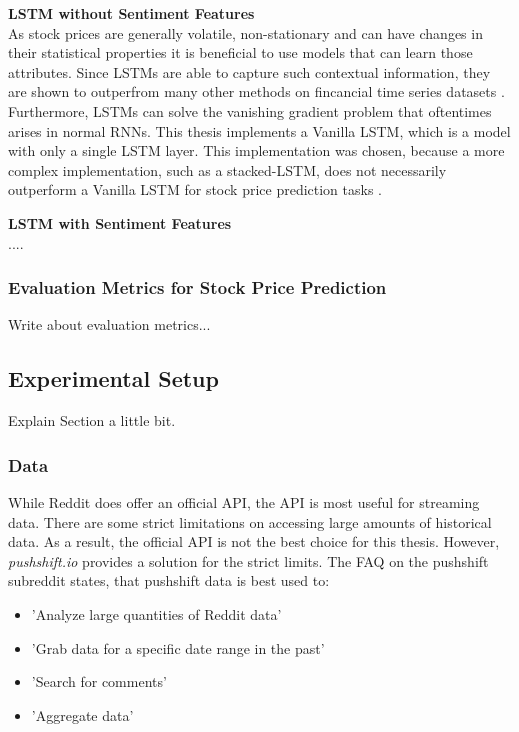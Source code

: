 \documentclass[11pt, a4paper]{article}
\begin{document}
\noindent\textbf{LSTM without Sentiment Features}\\
As stock prices are generally volatile, non-stationary and can have changes in their statistical properties it is beneficial to use
models that can learn those attributes. Since LSTMs are able to capture such contextual information, they are shown to outperfrom many other methods
on fincancial time series datasets \citep{preeti2019lstm}. Furthermore, LSTMs can solve the vanishing gradient problem that oftentimes arises in
normal RNNs. This thesis implements a Vanilla LSTM, which is a model with only a single LSTM layer. This implementation was chosen, because a more complex
implementation, such as a stacked-LSTM, does not necessarily outperform a Vanilla LSTM for stock price prediction tasks \citep{hai2020lstms}.

\noindent\textbf{LSTM with Sentiment Features}\\
....

\subsubsection{Evaluation Metrics for Stock Price Prediction}
Write about evaluation metrics...

\subsection{Experimental Setup}
Explain Section a little bit.

\subsubsection{Data}

While Reddit does offer an official API, the API is most useful for streaming data. 
There are some strict limitations on accessing large amounts of historical data. As a result, the official API is not the best choice for this thesis. 
However, \emph{pushshift.io} provides a solution for the strict limits.
The FAQ on the pushshift subreddit states, that pushshift data is best used to:
\begin{itemize}
    \item 'Analyze large quantities of Reddit data'
    \item 'Grab data for a specific date range in the past'
    \item 'Search for comments'
    \item 'Aggregate data'
\end{itemize}
\end{document}
